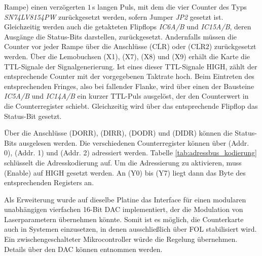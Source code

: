 Rampe) einen verzögerten $1\,$\textmu s langen Puls, mit dem die vier Counter
des Typs \textit{SN74LV8154PW} zurückgesetzt werden, sofern Jumper \textit{JP2}
gesetzt ist. Gleichzeitig werden auch die getakteten Flipflops \textit{IC6A/B}
und \textit{IC15A/B}, deren Ausgänge die Status-Bits darstellen, zurückgesetzt.
Andernfalls müssen die Counter vor jeder Rampe über die Anschlüsse
($\overline{\text{CLR}}$) oder ($\overline{\text{CLR2}}$) zurückgesetzt werden.
Über die Lemobuchsen (X1), (X7), (X8) und (X9) erhält die Karte die TTL-Signale
der Signalgenerierung. Ist eines dieser TTL-Signale HIGH, zählt der
entsprechende Counter mit der vorgegebenen Taktrate hoch. Beim Eintreten des
entsprechenden Fringes, also bei fallender Flanke, wird über einen der Bausteine
\textit{IC5A/B} und \textit{IC14A/B} ein kurzer TTL-Puls ausgelöst, der den
Counterwert in die Counterregister schiebt. Gleichzeitig wird über das
entsprechende Flipflop das Status-Bit gesetzt.\par
Über die Anschlüsse (DORR), (DIRR), (DODR) und (DIDR) können die Status-Bits
ausgelesen werden. Die verschiedenen Counterregister können über (Addr. 0),
(Addr. 1) und (Addr. 2) adressiert werden. Tabelle
\ref{tab:adressbus_kodierung} schlüsselt die Adresskodierung auf. Um die
Adressierung zu aktivieren, muss (Enable) auf HIGH gesetzt werden. An (Y0) bis
(Y7) liegt dann das Byte des entsprechenden Registers an.\par Als Erweiterung wurde auf dieselbe Platine das Interface für einen modularen
unabhängigen vierfachen 16-Bit DAC implementiert, der die Modulation von
Laserparametern übernehmen könnte. Somit ist es möglich, die Counterkarte auch
in Systemen einzusetzen, in denen ausschließlich über FOL stabilisiert wird. Ein
zwischengeschalteter Mikrocontroller würde die Regelung übernehmen. Details über
den DAC können \cite{counterkarte_laserstabilisierung} entnommen werden.
